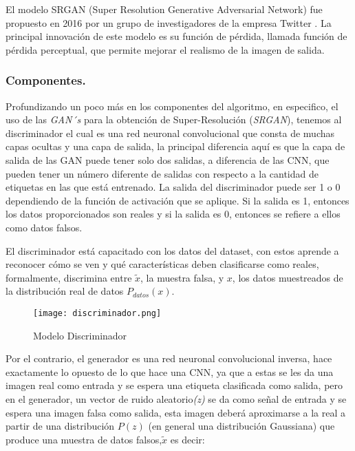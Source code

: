 El modelo SRGAN (Super Resolution Generative Adversarial Network) fue
propuesto en 2016 por un grupo de investigadores de la empresa Twitter \cite{SRGAN}.
La principal innovación de este modelo es su función de pérdida, llamada
función de pérdida perceptual, que permite mejorar el realismo de la imagen de
salida.

\subsubsection{Componentes.}

Profundizando un poco más en los componentes del algoritmo, en especifico, el uso de las \emph{GAN´s} para la obtención de Super-Resolución (\emph{SRGAN}), 
tenemos al discriminador el cual es una red neuronal convolucional que consta de muchas 
capas ocultas y una capa de salida, la principal diferencia aquí es que la capa de salida de las GAN puede tener solo dos salidas, 
a diferencia de las CNN, que pueden tener un número diferente de salidas con respecto a la cantidad de etiquetas en las que está entrenado.
La salida del discriminador puede ser 1 o 0 dependiendo de la función de activación que se aplique. Si la salida es 1, 
entonces los datos proporcionados son reales y si la salida es 0, entonces se refiere a ellos como datos falsos.

El discriminador está capacitado con los datos del dataset, con estos aprende a reconocer cómo se ven y qué características deben 
clasificarse como reales, formalmente, discrimina entre $\tilde{x}$, la muestra falsa, y $x$, 
los datos muestreados de la distribución real de datos $P_{datos}(x)$.




\begin{figure}[H]
    \begin{center}
      \texttt{[image: discriminador.png]}
      \caption{Modelo Discriminador}
      \label{Alexis2}
    \end{center}
\end{figure}


Por el contrario, el generador es una red neuronal convolucional inversa, hace exactamente lo opuesto de lo que hace una CNN, ya que 
a estas se les da una imagen real como entrada y se espera una etiqueta clasificada como salida, 
pero en el generador, un vector de ruido aleatorio\emph{(z)} se da como señal de entrada 
y se espera una imagen falsa como salida, esta imagen deberá aproximarse a la real a
partir de una distribución $P(z)$ (en general una distribución Gaussiana) que
produce una muestra de datos falsos,$\tilde{x}$ es decir:

